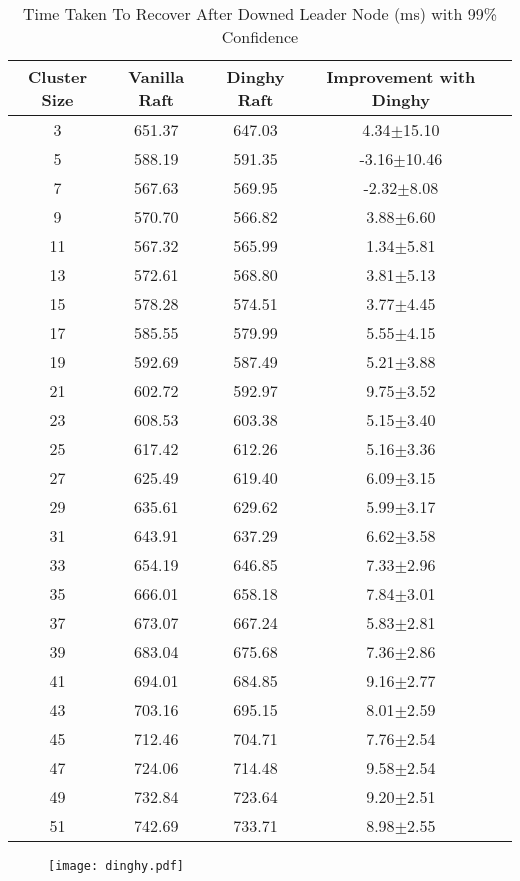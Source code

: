 \begin{table*}[t]
	\centering
	\caption*{Time Taken To Recover After Downed Leader Node (ms) with 99\% Confidence}
	\begin{tabular}{|c||c|c|c|c|}
	\hline
 	Cluster Size & Vanilla Raft & Dinghy Raft & Improvement with Dinghy \\ 
  	\hline
	3 & 651.37 & 647.03 & 4.34$\pm$15.10 \\ 
	5 & 588.19 & 591.35 & -3.16$\pm$10.46 \\ 
	7 & 567.63 & 569.95 & -2.32$\pm$8.08 \\ 
	9 & 570.70 & 566.82 & 3.88$\pm$6.60 \\ 
	11 & 567.32 & 565.99 & 1.34$\pm$5.81 \\ 
	13 & 572.61 & 568.80 & 3.81$\pm$5.13 \\ 
	15 & 578.28 & 574.51 & 3.77$\pm$4.45 \\ 
	17 & 585.55 & 579.99 & 5.55$\pm$4.15 \\ 
	19 & 592.69 & 587.49 & 5.21$\pm$3.88 \\ 
	21 & 602.72 & 592.97 & 9.75$\pm$3.52 \\ 
	23 & 608.53 & 603.38 & 5.15$\pm$3.40 \\ 
	25 & 617.42 & 612.26 & 5.16$\pm$3.36 \\ 
	27 & 625.49 & 619.40 & 6.09$\pm$3.15 \\ 
	29 & 635.61 & 629.62 & 5.99$\pm$3.17 \\ 
	31 & 643.91 & 637.29 & 6.62$\pm$3.58 \\ 
	33 & 654.19 & 646.85 & 7.33$\pm$2.96 \\ 
	35 & 666.01 & 658.18 & 7.84$\pm$3.01 \\ 
	37 & 673.07 & 667.24 & 5.83$\pm$2.81 \\ 
	39 & 683.04 & 675.68 & 7.36$\pm$2.86 \\ 
	41 & 694.01 & 684.85 & 9.16$\pm$2.77 \\ 
	43 & 703.16 & 695.15 & 8.01$\pm$2.59 \\ 
	45 & 712.46 & 704.71 & 7.76$\pm$2.54 \\ 
	47 & 724.06 & 714.48 & 9.58$\pm$2.54 \\ 
	49 & 732.84 & 723.64 & 9.20$\pm$2.51 \\ 
	51 & 742.69 & 733.71 & 8.98$\pm$2.55 \\ 
	\hline
	\end{tabular}
\end{table*}




\begin{figure}[!h]
\centering
\texttt{[image: dinghy.pdf]}
\end{figure}


